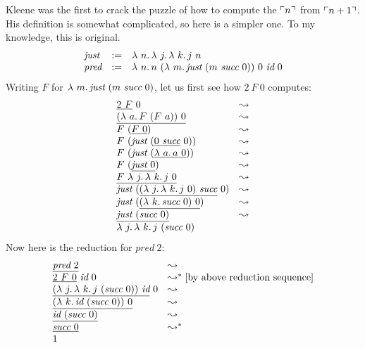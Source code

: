  Kleene was the first to crack the puzzle of how to compute the $\ulcorner n \urcorner$ from $\ulcorner n+1 \urcorner$.
His definition is somewhat complicated, so here is a simpler one.  To my knowledge, this is original.  
\[
\begin{array}{lll}
\textit{just} & := & \lam{n}{\lam{j}{\lam{k}{j\ n}}} \\
\textit{pred} & := & \lam{n}{n\ (\lam{m}{\textit{just}\ (m\ \textit{succ}\ 0)})\ 0\ \textit{id}\ 0}
\end{array}
\]
\noindent Writing $F$ for $\lam{m}{\textit{just}\ (m\ \textit{succ}\ 0)}$, let us first see how $2\ F\ 0$ computes:
\[
\begin{array}{ll}
  \underline{2\ F}\ 0 & \leadsto \\
  \underline{(\lam{a}{F\ (F\ a)})\ 0} & \leadsto \\
  F\ (\underline{F\ 0}) & \leadsto \\
  F\ (\textit{just}\ (\underline{0\ \textit{succ}}\ 0)) & \leadsto \\
  F\ (\textit{just}\ (\underline{\lam{a}{a}\ 0})) & \leadsto \\
  F\ (\underline{\textit{just}\ 0}) & \leadsto \\
  \underline{F\ \lam{j}{\lam{k}{j\ 0}}} & \leadsto \\    
  \textit{just}\ (\underline{(\lam{j}{\lam{k}{j\ 0}})\ \textit{succ}}\ 0) & \leadsto \\
  \textit{just}\ (\underline{(\lam{k}{\textit{succ}\ 0})\ 0}) & \leadsto \\
  \underline{\textit{just}\ (\textit{succ}\ 0)} & \leadsto \\
  \lam{j}{\lam{k}{j\ (\textit{succ}\ 0)}} & \ 
\end{array}
\]
\noindent Now here is the reduction for $\textit{pred}\ 2$:
\[
\begin{array}{ll}
  \underline{\textit{pred}\ 2} & \leadsto \\
  \underline{2\ F\ 0}\ \textit{id}\ 0 & \leadsto^* \textnormal{[by above reduction sequence]}\\
  \underline{(\lam{j}{\lam{k}{j\ (\textit{succ}\ 0)}})\ \textit{id}}\ 0 & \leadsto \\
  \underline{(\lam{k}{\textit{id}\ (\textit{succ}\ 0)})\ 0} & \leadsto \\
  \underline{\textit{id}\ (\textit{succ}\ 0)} & \leadsto \\
  \underline{\textit{succ}\ 0} & \leadsto^* \\
  1 &\ 
\end{array}
\]
  

